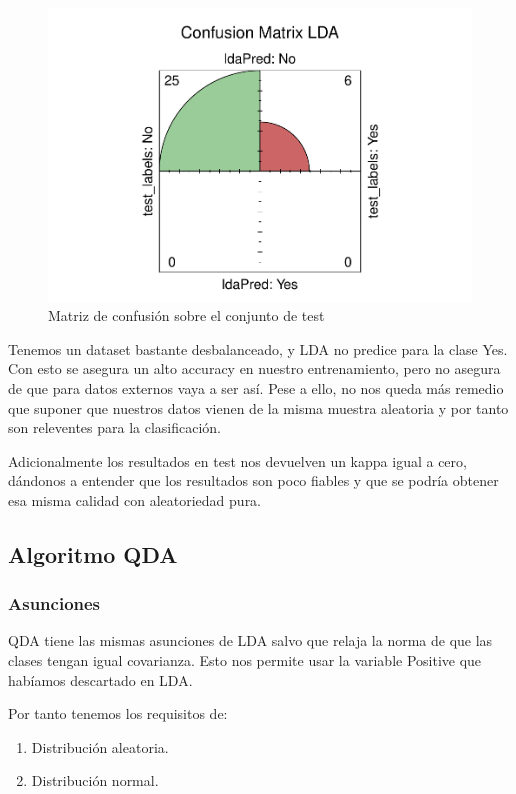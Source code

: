 \begin{figure}[H]\center\includegraphics[width=.9\linewidth]{img/Clasificacion_files/figure-latex/unnamed-chunk-21-1}\caption{Matriz de confusión sobre el conjunto de test}\end{figure}

Tenemos un dataset bastante desbalanceado, y LDA no predice para la clase Yes. Con esto se asegura un alto accuracy en nuestro entrenamiento, pero no asegura de que para datos externos vaya a ser así. Pese a ello, no nos queda más remedio que suponer que nuestros datos vienen de la misma muestra aleatoria y por tanto son releventes para la clasificación.

Adicionalmente los resultados en test nos devuelven un kappa igual a cero, dándonos a entender que los resultados son poco fiables y que se podría obtener esa misma calidad con aleatoriedad pura.

\subsection{Algoritmo QDA}
\subsubsection{Asunciones}

QDA tiene las mismas asunciones de LDA salvo que relaja la norma de que las clases tengan igual covarianza. Esto nos permite usar la variable Positive que habíamos descartado en LDA.

\vspace{\baselineskip}

Por tanto tenemos los requisitos de: 
\begin{enumerate}
    \item Distribución aleatoria.
    \item Distribución normal.
\end{enumerate}

